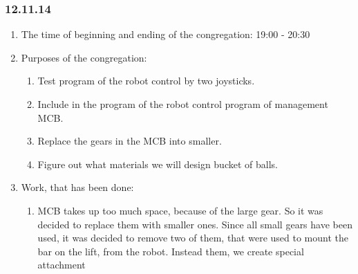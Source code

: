 
\subsubsection{12.11.14} 

\begin{enumerate} 
	\item The time of beginning and ending of the congregation:
	19:00 - 20:30
	\item Purposes of the congregation:
	\begin{enumerate}
		\item Test program of the robot control by two joysticks.
		
		\item Include in the program of the robot control program of management MCB.
		
		\item Replace the gears in the MCB into smaller.
		
		\item Figure out what materials we will design bucket of balls.
		
	\end{enumerate}
	
	\item Work, that has been done:
	\begin{enumerate}
		\item MCB takes up too much space, because of the large gear. So it was decided to replace them with smaller ones. Since all small gears have been used, it was decided to remove two of them, that were used to mount the bar on the lift, from the robot. Instead them, we create special attachment
		

\end{enumerate}
\end{enumerate}
